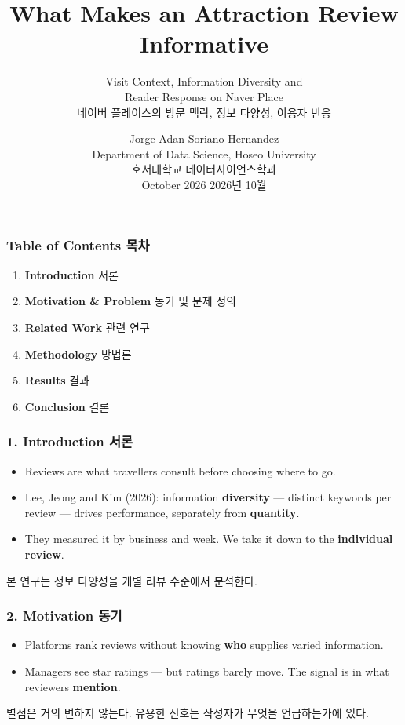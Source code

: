 \documentclass[compress]{beamer}
\title{What Makes an Attraction Review Informative}
\subtitle{Visit Context, Information Diversity and\\ Reader Response on Naver Place\\[4pt]
          \small 네이버 플레이스의 방문 맥락, 정보 다양성, 이용자 반응}
\author{Jorge Adan Soriano Hernandez\\[3pt]
        \small Department of Data Science, Hoseo University\\
        \small 호서대학교 데이터사이언스학과\\[3pt]
        \small October 2026 \quad 2026년 10월}
\newcommand{\ko}[1]{{\footnotesize\color{black!50}#1}}
\newcommand{\kosub}[1]{{\scriptsize\color{black!55}#1}}
\begin{document}
\maketitle

\begin{frame}
\frametitle{Table of Contents \ko{목차}}
\small
\begin{enumerate}\itemsep4pt
  \item \textbf{Introduction} \ko{서론}
  \item \textbf{Motivation \& Problem} \ko{동기 및 문제 정의}
  \item \textbf{Related Work} \ko{관련 연구}
  \item \textbf{Methodology} \ko{방법론}
  \item \textbf{Results} \ko{결과}
  \item \textbf{Conclusion} \ko{결론}
\end{enumerate}
\end{frame}

\begin{frame}
\frametitle{1. Introduction \ko{서론}}
\small
\begin{itemize}\itemsep6pt
  \item Reviews are what travellers consult before choosing where to go.
  \item Lee, Jeong and Kim (2026): information \textbf{diversity} — distinct
        keywords per review — drives performance, separately from
        \textbf{quantity}.
  \item They measured it by business and week. We take it down to the
        \textbf{individual review}.
\end{itemize}
\vspace{6pt}
\kosub{본 연구는 정보 다양성을 개별 리뷰 수준에서 분석한다.}
\end{frame}

\begin{frame}
\frametitle{2. Motivation \ko{동기}}
\small
\begin{itemize}\itemsep8pt
  \item Platforms rank reviews without knowing \textbf{who} supplies varied
        information.
  \item Managers see star ratings — but ratings barely move. The signal is in
        what reviewers \textbf{mention}.
\end{itemize}
\vspace{6pt}
\kosub{별점은 거의 변하지 않는다. 유용한 신호는 작성자가 무엇을 언급하는가에 있다.}
\end{frame}
\end{document}
